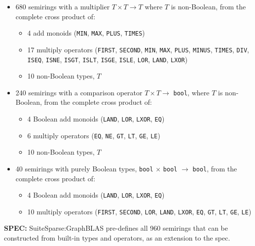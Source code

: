 \documentclass[12pt]{article}
\begin{document}
\begin{itemize}
\item 680 semirings with a multiplier $T \times T \rightarrow T$ where $T$ is
    non-Boolean, from the complete cross product of:

    \begin{itemize}
    \item 4 add monoids (\verb'MIN', \verb'MAX', \verb'PLUS', \verb'TIMES')
    \item 17 multiply operators
    (\verb'FIRST', \verb'SECOND', \verb'MIN', \verb'MAX',
    \verb'PLUS', \verb'MINUS', \verb'TIMES', \verb'DIV',
    \verb'ISEQ', \verb'ISNE', \verb'ISGT',
    \verb'ISLT', \verb'ISGE', \verb'ISLE',
    \verb'LOR', \verb'LAND', \verb'LXOR')
    \item 10 non-Boolean types, $T$
    \end{itemize}

\item 240 semirings with a comparison operator $T \times T \rightarrow$
    \verb'bool', where $T$ is non-Boolean, from the complete cross product of:

    \begin{itemize}
    \item 4 Boolean add monoids
    (\verb'LAND', \verb'LOR', \verb'LXOR', \verb'EQ')
    \item 6 multiply operators
    (\verb'EQ', \verb'NE', \verb'GT', \verb'LT', \verb'GE', \verb'LE')
    \item 10 non-Boolean types, $T$
    \end{itemize}

\item 40 semirings with purely Boolean types, \verb'bool' $\times$ \verb'bool'
    $\rightarrow$ \verb'bool', from the complete cross product of:

    \begin{itemize}
    \item 4 Boolean add monoids
    (\verb'LAND', \verb'LOR', \verb'LXOR', \verb'EQ')
    \item 10 multiply operators
    (\verb'FIRST', \verb'SECOND', \verb'LOR', \verb'LAND', \verb'LXOR',
    \verb'EQ', \verb'GT', \verb'LT', \verb'GE', \verb'LE')
    \end{itemize}

\end{itemize}

\begin{spec}
{\bf SPEC:} SuiteSparse:GraphBLAS pre-defines all 960 semirings that can be constructed from built-in types and operators, as an extension to the spec.
\end{spec}
\end{document}
